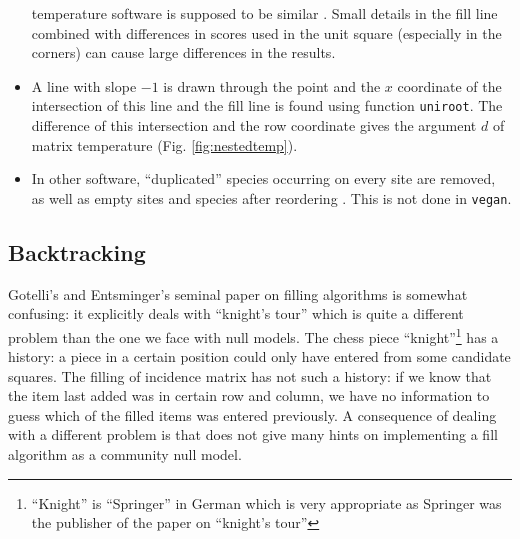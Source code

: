 \documentclass[a4paper,10pt]{amsart}
\begin{document}
\begin{itemize}
    temperature software \cite{AtmarPat93} is supposed to be similar
    \citep{RodGir06}. Small details in the fill line combined with
    differences in scores used in the unit square (especially in the
    corners) can cause large differences in the results.
  \item A line with slope $-1$ is drawn through the point and the $x$
    coordinate of the intersection of this line and the fill line is
    found using function \texttt{uniroot}. The difference of this
    intersection and the row coordinate gives the argument $d$ of matrix
    temperature (Fig. \ref{fig:nestedtemp}).
  \item In other software, ``duplicated'' species occurring on every
    site are removed, as well as empty sites and species after
    reordering \cite{RodGir06}. This is not done in \texttt{vegan}.
\end{itemize}

\subsection{Backtracking}

Gotelli's and Entsminger's seminal paper \cite{GotelliEnt01} on filling
algorithms is somewhat confusing: it explicitly deals with ``knight's
tour'' which is quite a different problem than the one we face with
null models.  The chess piece ``knight''\footnote{``Knight'' is
  ``Springer'' in German which is very appropriate as Springer was the
  publisher of the paper on ``knight's tour''} has a history:
a piece in a certain position could only have entered from some
candidate squares. The filling of incidence matrix has not such a history:
if we know that the item last added was in certain row and column, we
have no information to guess which of the filled items was entered
previously. A consequence of dealing with a different problem is that
\cite{GotelliEnt01} does not give many hints on implementing a fill
algorithm as a community null model.
\end{document}
